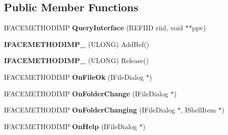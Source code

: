 \subsection*{Public Member Functions}
\begin{DoxyCompactItemize}
\item 
\hypertarget{class_c_dialog_event_handler_a83da55cdef6e1160d6c8a0d613ca3bb5}{I\-F\-A\-C\-E\-M\-E\-T\-H\-O\-D\-I\-M\-P {\bfseries Query\-Interface} (R\-E\-F\-I\-I\-D riid, void $\ast$$\ast$ppv)}\label{class_c_dialog_event_handler_a83da55cdef6e1160d6c8a0d613ca3bb5}

\item 
\hypertarget{class_c_dialog_event_handler_a6f364e8217fa0170c12961e2129037f8}{{\bfseries I\-F\-A\-C\-E\-M\-E\-T\-H\-O\-D\-I\-M\-P\-\_\-} (U\-L\-O\-N\-G) Add\-Ref()}\label{class_c_dialog_event_handler_a6f364e8217fa0170c12961e2129037f8}

\item 
\hypertarget{class_c_dialog_event_handler_a529db231d24cf00bcd543e28bd134f1b}{{\bfseries I\-F\-A\-C\-E\-M\-E\-T\-H\-O\-D\-I\-M\-P\-\_\-} (U\-L\-O\-N\-G) Release()}\label{class_c_dialog_event_handler_a529db231d24cf00bcd543e28bd134f1b}

\item 
\hypertarget{class_c_dialog_event_handler_ad81cf46a3da3540100a9d5545be6aa12}{I\-F\-A\-C\-E\-M\-E\-T\-H\-O\-D\-I\-M\-P {\bfseries On\-File\-Ok} (I\-File\-Dialog $\ast$)}\label{class_c_dialog_event_handler_ad81cf46a3da3540100a9d5545be6aa12}

\item 
\hypertarget{class_c_dialog_event_handler_ac1be3a80796da8f129eceb373bdca2a7}{I\-F\-A\-C\-E\-M\-E\-T\-H\-O\-D\-I\-M\-P {\bfseries On\-Folder\-Change} (I\-File\-Dialog $\ast$)}\label{class_c_dialog_event_handler_ac1be3a80796da8f129eceb373bdca2a7}

\item 
\hypertarget{class_c_dialog_event_handler_ac8f0dd067b1a96f311bed4db0488788f}{I\-F\-A\-C\-E\-M\-E\-T\-H\-O\-D\-I\-M\-P {\bfseries On\-Folder\-Changing} (I\-File\-Dialog $\ast$, I\-Shell\-Item $\ast$)}\label{class_c_dialog_event_handler_ac8f0dd067b1a96f311bed4db0488788f}

\item 
\hypertarget{class_c_dialog_event_handler_aef6df46e375d52303619d97bca9fe57e}{I\-F\-A\-C\-E\-M\-E\-T\-H\-O\-D\-I\-M\-P {\bfseries On\-Help} (I\-File\-Dialog $\ast$)}\label{class_c_dialog_event_handler_aef6df46e375d52303619d97bca9fe57e}


\end{DoxyCompactItemize}
